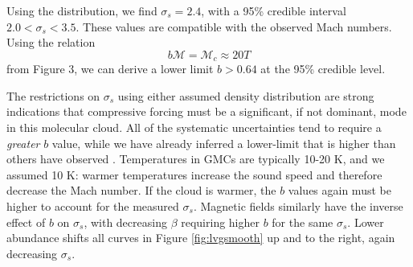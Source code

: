 Using the \citet{Hopkins2013a} distribution, we find $\sigma_s=2.4$, with
a 95\% credible interval $2.0 < \sigma_s < 3.5$.  These values are
compatible with the observed Mach numbers.  Using the relation 
\begin{equation}
    \label{eqn:McMT}
    b \mathcal{M} = \mathcal{M}_c  \approx 20 T
\end{equation}
from \citet{Hopkins2013a} Figure 3, we can derive a lower limit $b>0.64$ at the
95\% credible level.%


% 
% 
% 

The restrictions on $\sigma_s$ using either assumed density distribution are
strong indications that compressive forcing must be a significant, if not
dominant, mode in this molecular cloud.  
All of the systematic uncertainties tend to require a \emph{greater} $b$
value, while we have already inferred a lower-limit
that is higher than others have observed \citep{Brunt2010c,Kainulainen2013a}.
Temperatures in GMCs are typically 10-20 K, and we assumed 10 K: warmer
temperatures increase the sound speed and therefore decrease the Mach number. If
the cloud is warmer, the $b$ values again must be higher to account for the measured
$\sigma_s$.  Magnetic fields similarly have the inverse effect of $b$ on
$\sigma_s$, with decreasing $\beta$ requiring higher $b$ for the same
$\sigma_s$.
Lower abundance shifts all curves in Figure
\ref{fig:lvgsmooth} up and to the right, again decreasing $\sigma_s$.

